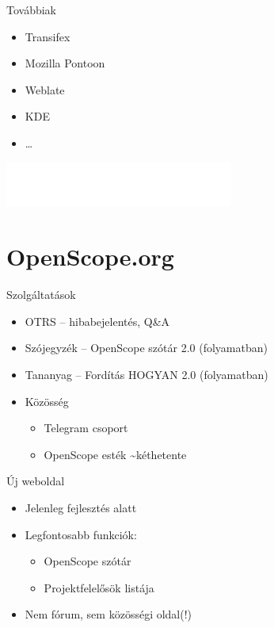 \documentclass{beamer}
\begin{document}
  \begin{frame}{Továbbiak}
   \begin{itemize}
     \item Transifex
     \item Mozilla Pontoon
     \item Weblate
     \item KDE
     \item …
   \end{itemize}
  \end{frame}

  \begin{frame}[standout]
    \includegraphics[width=7.5cm]{images/openscope-white.png}
  \end{frame}

  \section{OpenScope.org}

  \begin{frame}{Szolgáltatások}
    \begin{itemize}
      \item OTRS – hibabejelentés, Q\&A
      \item Szójegyzék – OpenScope szótár 2.0 (folyamatban)
      \item Tananyag – Fordítás HOGYAN 2.0 (folyamatban)
      \item Közösség
        \begin{itemize}
          \item Telegram csoport
          \item OpenScope esték \textasciitilde kéthetente
        \end{itemize}
    \end{itemize}
  \end{frame}

  \begin{frame}{Új weboldal}
    \begin{itemize}
      \item Jelenleg fejlesztés alatt
      \item Legfontosabb funkciók:
        \begin{itemize}
          \item OpenScope szótár
          \item Projektfelelősök listája
        \end{itemize}
      \item Nem fórum, sem közösségi oldal(!)
    \end{itemize}
  \end{frame}
\end{document}
